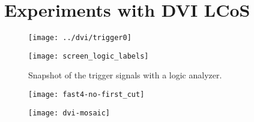 \chapter{Experiments with DVI LCoS}

\begin{figure}[!hbt]
  \centering
  \texttt{[image: ../dvi/trigger0]}
  \caption{}
  \label{fig:trigger0}
\end{figure}


\begin{figure}[!hbt]
  \centering
  \texttt{[image: screen\_logic\_labels]}
  \caption{Snapshot of the trigger signals with a logic analyzer.}
  \label{fig:screen_logic_labels}
\end{figure}

\begin{figure}[!hbt]
  \centering
  \texttt{[image: fast4-no-first\_cut]}
  \caption{}
  \label{fig:fast4-no-first_cut}
\end{figure}


\begin{figure}[!hbt]
  \centering
  \texttt{[image: dvi-mosaic]}
  \caption{}
  \label{fig:dvi-mosaic}
\end{figure}

